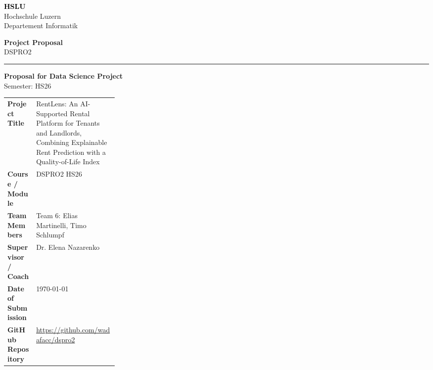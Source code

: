 \documentclass[11pt,a4paper]{article}
\newcommand{\hsluwordmark}{%
  {\fontsize{22}{24}\selectfont\bfseries\textcolor{black}{HSLU}}%
}
\newcommand{\proposaltype}{%
  {\fontsize{13}{15}\selectfont\bfseries Project Proposal}
}
\newcommand{\moduleline}{%
  {\fontsize{11}{13}\selectfont DSPRO2}
}
\begin{document}
\begin{minipage}[t]{0.62\textwidth}
    \hsluwordmark\\[-1mm]
    {\small\color{hsluGray}Hochschule Luzern}\\[-0.5mm]
    {\small\color{hsluGray}Departement Informatik}
\end{minipage}
\hfill
\begin{minipage}[t]{0.35\textwidth}
    \raggedleft
    \proposaltype\\[1mm]
    \moduleline
\end{minipage}

\vspace{8mm}
{\color{hsluGray}\rule{\textwidth}{1.2pt}}

\vspace{8mm}

\begin{center}
    {\LARGE\bfseries\color{hsluDark}Proposal for Data Science Project}\\[1mm]
    {\large\color{hsluGray}Semester: HS26}
\end{center}

\vspace{8mm}

\colorbox{boxGray}{%
\parbox{\dimexpr\linewidth-2\fboxsep\relax}{
\vspace{1mm}
\renewcommand{\arraystretch}{1.35}
\begin{tabularx}{\linewidth}{>{\bfseries}p{0.26\linewidth} X}
Project Title & RentLens: An AI-Supported Rental Platform for Tenants and Landlords, Combining Explainable Rent Prediction with a Quality-of-Life Index \\
Course / Module & DSPRO2 HS26 \\
Team Members & Team 6: Elias Martinelli, Timo Schlumpf \\
Supervisor / Coach & Dr. Elena Nazarenko \\
Date of Submission & \today \\
GitHub Repository & \url{https://github.com/wadafacc/dspro2} \\
\end{tabularx}
\vspace{1mm}
}
}

\vspace{1em}

\end{document}
